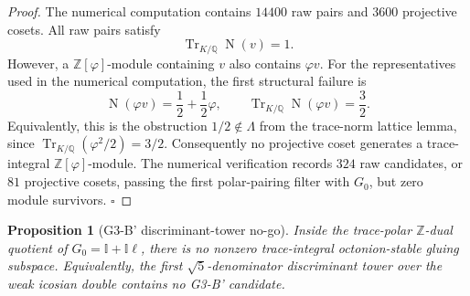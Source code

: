 \documentclass[12pt,oneside,english]{amsart}
\numberwithin{equation}{section}
\numberwithin{figure}{section}
\numberwithin{table}{section}
\theoremstyle{plain}
\newtheorem{proposition}[theorem]{Proposition}
\theoremstyle{definition}
\theoremstyle{remark}
\newcommand{\ZZ}{\mathbb Z}
\newcommand{\QQ}{\mathbb Q}
\newcommand{\Zphi}{\mathbb Z[\varphi]}
\newcommand{\Tr}{\operatorname{Tr}}
\newcommand{\Norm}{\operatorname{N}}
\begin{document}
\begin{proof}
The numerical computation contains \(14400\) raw pairs and \(3600\) projective cosets. All raw pairs satisfy
\begin{equation}
\Tr_{K/\QQ}\Norm(v)=1.
\end{equation}
However, a \(\Zphi\)-module containing \(v\) also contains \(\varphi v\). For the representatives used in the numerical computation, the first structural failure is
\begin{equation}
\Norm(\varphi v)=\frac12+\frac12\varphi,\qquad
\Tr_{K/\QQ}\Norm(\varphi v)=\frac32.
\end{equation}
Equivalently, this is the obstruction \(1/2\notin\Lambda\) from the trace-norm lattice lemma, since \(\Tr_{K/\QQ}(\varphi^2/2)=3/2\). Consequently no projective coset generates a trace-integral \(\Zphi\)-module. The numerical verification records \(324\) raw candidates, or \(81\) projective cosets, passing the first polar-pairing filter with \(G_0\), but zero module survivors. \(\square\)
\end{proof}

\begin{proposition}[G3-B' discriminant-tower no-go]
\label{prop:g3-b-tower-no-go}
Inside the trace-polar \(\ZZ\)-dual quotient of \(G_0=\mathbb I+\mathbb I\ell\), there is no nonzero trace-integral octonion-stable gluing subspace. Equivalently, the first \(\sqrt5\)-denominator discriminant tower over the weak icosian double contains no G3-B' candidate.
\end{proposition}
\end{document}
